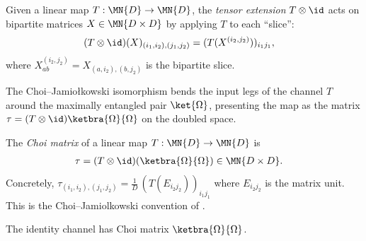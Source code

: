 \begin{definition}\label{def:tensor_map_id}
    \leanok
    Given a linear map $T : \MN{D} \to \MN{D}$,
    the \emph{tensor extension} $T \otimes \id$ acts on bipartite matrices
    $X \in \MN{D \times D}$ by applying $T$ to each ``slice'':
    \begin{align}
        (T \otimes \id)(X)_{(i_1,i_2),(j_1,j_2)}
        &= (T(X^{(i_2,j_2)}))_{i_1 j_1},
        \label{eq:representations_tensor_map_id}
    \end{align}
    where $X^{(i_2,j_2)}_{ab} = X_{(a,i_2),(b,j_2)}$ is the
    bipartite slice.
\end{definition}


The Choi--Jamio\l{}kowski isomorphism bends the input legs of the channel $T$
around the maximally entangled pair $\ket{\Omega}$, presenting the map as the
matrix $\tau=(T\otimes\id)\ketbra{\Omega}{\Omega}$ on the doubled space.

\begin{definition}\label{def:choi_matrix}
    \leanok
    The \emph{Choi matrix} of a linear map
    $T : \MN{D} \to \MN{D}$ is
    \begin{align}
        \tau
        &= (T \otimes \id)(\ketbra{\Omega}{\Omega})
        \in \MN{D \times D}.
        \label{eq:representations_choi}
    \end{align}
    Concretely,
    $\tau_{(i_1,i_2),(j_1,j_2)}
        = \frac{1}{D}\,(T(E_{i_2 j_2}))_{i_1 j_1}$
    where $E_{i_2 j_2}$ is the matrix unit.
    This is the Choi--Jamiol\-kowski convention of
    \cite[Proposition~2.1]{Wolf2012Quantum}.

\end{definition}

\begin{theorem}\label{thm:choi_matrix_id}
    \leanok
    The identity channel has Choi matrix
    $\ketbra{\Omega}{\Omega}$.
\end{theorem}

